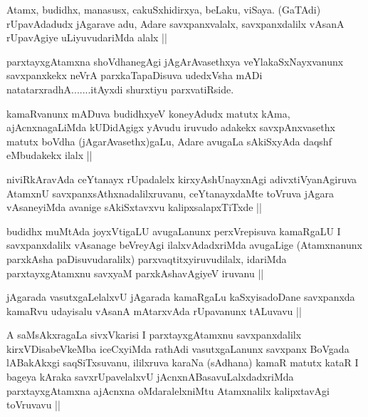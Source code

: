
\begin{artha}
Atamx, budidhx, manasusx, cakuSxhidirxya, beLaku, viSaya. (GaTAdi) rUpavAdadudx jAgarave adu, Adare savxpanxvalalx, savxpanxdalilx vAsanA rUpavAgiye uLiyuvudariMda alalx ||
\end{artha}

\begin{artha}
parxtayxgAtamxna shoVdhanegAgi jAgArAvasethxya veYlakaSxNayxvanunx savxpanxkekx neVrA parxkaTapaDisuva udedxVsha mADi natatarxradhA.......itAyxdi shurxtiyu parxvatiRside.
\end{artha}


\begin{artha}
kamaRvanunx mADuva budidhxyeV koneyAdudx matutx kAma, ajAcnxnagaLiMda kUDidAgigx yAvudu iruvudo adakekx savxpAnxvasethx matutx boVdha (jAgarAvasethx)gaLu, Adare avugaLa sAkiSxyAda daqshf eMbudakekx ilalx ||
\end{artha}


\begin{artha}
niviRkAravAda ceYtanayx rUpadalelx kirxyAshUnayxnAgi adivxtiVyanAgiruva AtamxnU savxpanxsAthxnadalilxruvanu, ceYtanayxdaMte toVruva jAgara vAsaneyiMda avanige sAkiSxtavxvu kalipxsalapxTiTxde ||
\end{artha}

\begin{artha}
budidhx muMtAda joyxVtigaLU avugaLanunx perxVrepisuva kamaRgaLU I savxpanxdalilx vAsanage beVreyAgi ilalxvAdadxriMda avugaLige (Atamxnanunx parxkAsha paDisuvudaralilx) parxvaqtitxyiruvudilalx, idariMda parxtayxgAtamxnu savxyaM parxkAshavAgiyeV iruvanu ||
\end{artha}


\begin{artha}
jAgarada vasutxgaLelalxvU jAgarada kamaRgaLu kaSxyisadoDane savxpanxda kamaRvu udayisalu vAsanA mAtarxvAda rUpavanunx tALuvavu ||
\end{artha}


\begin{artha}
A saMsAkxragaLa sivxVkarisi I parxtayxgAtamxnu savxpanxdalilx kirxVDisabeVkeMba iceCxyiMda rathAdi vasutxgaLanunx savxpanx BoVgada lABakAkxgi saqSiTxsuvanu, ililxruva karaNa (sAdhana) kamaR matutx kataR I bageya kAraka savxrUpavelalxvU jAcnxnABasavuLalxdadxriMda parxtayxgAtamxna ajAcnxna oMdaralelxniMtu Atamxnalilx kalipxtavAgi toVruvavu ||
\end{artha}

